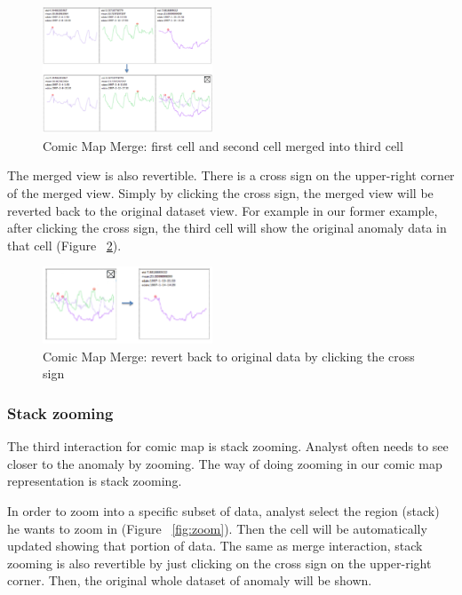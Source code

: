 \documentclass{vgtc}                          %
\begin{document}
\begin{figure}[htb]
	\centering
	\includegraphics[width=0.45\textwidth]{merge.jpg}
	\caption{Comic Map Merge: first cell and second cell merged into third cell}
	\label{fig:merge}
\end{figure}

The merged view is also revertible. There is a cross sign on the upper-right corner of the merged view. Simply by clicking the cross sign, the merged view will be reverted back to the original dataset view. For example in our former example, after clicking the cross sign, the third cell will show the original anomaly data in that cell (Figure ~\ref{fig:merge2}).

\begin{figure}[htb]
	\centering
	\includegraphics[width=0.45\textwidth]{merge2.jpg}
	\caption{Comic Map Merge: revert back to original data by clicking the cross sign}
	\label{fig:merge2}
\end{figure}

\subsubsection{Stack zooming}
The third interaction for comic map is stack zooming. Analyst often needs to see closer to the anomaly by zooming. The way of doing zooming in our comic map representation is stack zooming.

In order to zoom into a specific subset of data, analyst select the region (stack) he wants to zoom in (Figure ~\ref{fig:zoom}). Then the cell will be automatically updated showing that portion of data. The same as merge interaction, stack zooming is also revertible by just clicking on the cross sign on the upper-right corner. Then, the original whole dataset of anomaly will be shown.
\end{document}
